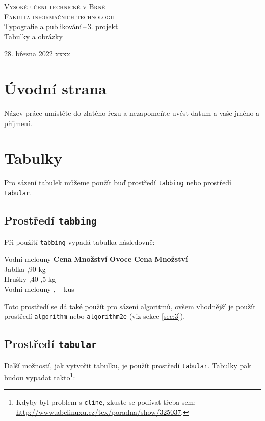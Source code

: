 \documentclass[a4paper, 11pt]{article}
\begin{document}
\begin{titlepage}
    \begin{center}
    \Huge\textsc{Vysoké učení technické v Brně\\
                \huge{Fakulta informačních technologií}}\\
    \LARGE{Typografie a publikování\,--\,3. projekt}\\
            \Huge{Tabulky a obrázky}\\
\end{center}
{\Large 28. března 2022 \hfill xxxx}
\end{titlepage}

\section{Úvodní strana}
Název práce umístěte do zlatého řezu a nezapomeňte uvést  datum a vaše jméno a příjmení.

\section{Tabulky}
Pro sázení tabulek můžeme použít buď prostředí \verb|tabbing| nebo prostředí \verb|tabular|.

\subsection{Prostředí \texttt{tabbing}}
Při použití \verb|tabbing| vypadá tabulka následovně:

\begin{tabbing}
  Vodní melouny \quad \= \textbf{Cena} \quad \= \textbf{Množství}\kill
  \textbf{Ovoce} \> \textbf{Cena} \> \textbf{Množství}\\
  Jablka ,90  kg\\
  Hrušky ,40 ,5 kg\\
  Vodní melouny ,\,--\,  kus\\
\end{tabbing}
Toto prostředí se dá také použít pro sázení algoritmů, ovšem vhodnější je použít prostředí \verb|algorithm| nebo \verb|algorithm2e| (viz sekce \ref{sec:3}).

\subsection{Prostředí \texttt{tabular}}
Další možností, jak vytvořit tabulku, je použít prostředí \verb|tabular|. Tabulky pak budou vypadat takto\footnote{Kdyby byl problem s \texttt{cline}, zkuste se podívat třeba sem: \href{http://www.abclinuxu.cz/tex/poradna/show/325037}{http://www.abclinuxu.cz/tex/poradna/show/325037}.}:
\end{document}
